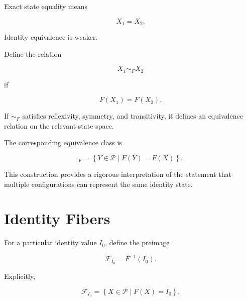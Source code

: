 \documentclass[12pt,oneside]{book}
\begin{document}
Exact state equality means

\begin{equation}
    X_1
    =
    X_2.
\end{equation}

Identity equivalence is weaker.

Define the relation

\begin{equation}
    X_1
    \sim_F
    X_2
\end{equation}

if

\begin{equation}
    F(X_1)
    =
    F(X_2).
    \label{eq:identity-equivalence}
\end{equation}

If \(\sim_F\) satisfies reflexivity, symmetry, and transitivity,
it defines an equivalence relation on the relevant state space.

The corresponding equivalence class is

\begin{equation}
    [X]_F
    =
    \left\{
        Y\in\mathcal{P}
        \mid
        F(Y)=F(X)
    \right\}.
    \label{eq:identity-equivalence-class}
\end{equation}

This construction provides a rigorous interpretation of the
statement that multiple configurations can represent the same
identity state.


\section{Identity Fibers}
\label{sec:identity-fibers}

For a particular identity value \(I_0\), define the preimage

\begin{equation}
    \mathcal{F}_{I_0}
    =
    F^{-1}(I_0).
    \label{eq:identity-fiber}
\end{equation}

Explicitly,

\begin{equation}
    \mathcal{F}_{I_0}
    =
    \left\{
        X\in\mathcal{P}
        \mid
        F(X)=I_0
    \right\}.
\end{equation}
\end{document}
